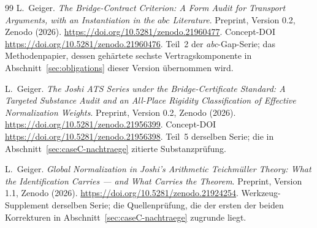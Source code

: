 \documentclass[11pt,a4paper]{article}
\theoremstyle{definition}
\begin{document}
\begin{thebibliography}{99}
L.~Geiger.
\newblock \emph{The Bridge-Contract Criterion: A Form Audit for Transport
Arguments, with an Instantiation in the $abc$ Literature}.
\newblock Preprint, Version 0.2, Zenodo (2026).
\newblock \url{https://doi.org/10.5281/zenodo.21960477}.
\newblock Concept-DOI \url{https://doi.org/10.5281/zenodo.21960476}.
\newblock Teil~2 der \emph{abc}-Gap-Serie; das Methodenpapier, dessen gehärtete
sechste Vertragskomponente in Abschnitt~\ref{sec:obligations} dieser Version
übernommen wird.

L.~Geiger.
\newblock \emph{The Joshi ATS Series under the Bridge-Certificate Standard: A
Targeted Substance Audit and an All-Place Rigidity Classification of Effective
Normalization Weights}.
\newblock Preprint, Version 0.2, Zenodo (2026).
\newblock \url{https://doi.org/10.5281/zenodo.21956399}.
\newblock Concept-DOI \url{https://doi.org/10.5281/zenodo.21956398}.
\newblock Teil~5 derselben Serie; die in
Abschnitt~\ref{sec:caseC-nachtraege} zitierte Substanzprüfung.

L.~Geiger.
\newblock \emph{Global Normalization in Joshi's Arithmetic Teichmüller Theory:
What the Identification Carries --- and What Carries the Theorem}.
\newblock Preprint, Version 1.1, Zenodo (2026).
\newblock \url{https://doi.org/10.5281/zenodo.21924254}.
\newblock Werkzeug-Supplement derselben Serie; die Quellenprüfung, die der ersten
der beiden Korrekturen in Abschnitt~\ref{sec:caseC-nachtraege} zugrunde liegt.

\end{thebibliography}
\end{document}
